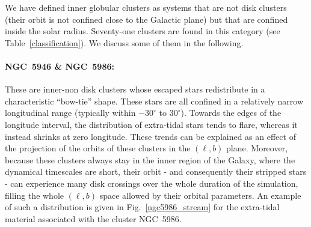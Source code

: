            We have defined inner globular clusters as systems that are not disk clusters (their orbit is not confined close to the Galactic plane) but that are confined inside the solar radius. Seventy-one clusters are found in this category (see  Table~\ref{classification}). We discuss some of them in the following.

            \paragraph{NGC~5946 \& NGC~5986:}

            These are inner-non disk clusters whose escaped stars redistribute in a characteristic ``bow-tie'' shape. These stars are all confined in a relatively narrow longitudinal range (typically within $-30^\circ$ to $30^\circ$). Towards the edges of the longitude interval, the distribution of extra-tidal stars tends to flare, whereas it instead shrinks at zero longitude. These trends can be explained as an effect of the projection of the orbits of these clusters in the $(\ell, b)$ plane.  Moreover, because these clusters always stay in the inner region of the Galaxy, where the dynamical timescales are short, their orbit - and consequently their stripped stars - can experience many disk crossings over the whole duration of the simulation, filling the whole $(\ell, b)$ space allowed by their orbital parameters. An example of such a distribution is given in Fig.~\ref{ngc5986_stream} for the extra-tidal material associated with the cluster NGC~5986.
            \twocolumn
